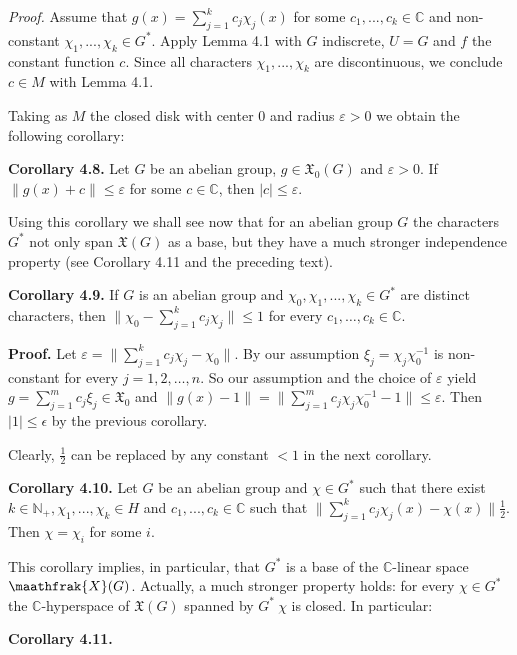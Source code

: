 \documentclass[12pt]{article}
\begin{document}
\emph{Proof.} Assume that $g(x) = \sum^k_{j=1} c_j \chi_j(x)$ for some $c_1,..., c_k \in \mathbb{C}$ and non-constant $\chi_1,...,\chi_k \in G^*$. Apply Lemma 4.1 with $G$
indiscrete, $U = G$ and $f$ the constant function $c$. Since all characters $\chi_1,...,\chi_k$ are discontinuous, we conclude $c \in M$ with
Lemma 4.1. 


    Taking as $M$ the closed disk with center 0 and radius $\varepsilon > 0$ we obtain the following corollary:


\textbf{Corollary 4.8.} Let $G$ be an abelian group, $g \in \mathfrak{X}_0 (G)$ and $\varepsilon > 0$. If $\|g(x) + c\| \leqslant  \varepsilon$ for some $c \in \mathbb{C}$, then $|c| \leqslant \varepsilon$.


    Using this corollary we shall see now that for an abelian group $G$ the characters $G^*$ not only span $\mathfrak{X}(G)$ as a base, but
they have a much stronger independence property (see Corollary 4.11 and the preceding text).


\textbf{Corollary 4.9.} If $G$ is an abelian group and $\chi_0,\chi_1,...,\chi_k \in G^*$ are distinct characters, then $\|\chi_0 - \sum^k_{j=1} c_j \chi_j\| \leqslant 1$ for every
$c_1, \dots, c_k \in \mathbb{C}$.


\textbf{Proof.} Let $\varepsilon = \| \sum^k_{j=1} c_j \chi_j - \chi_0 \|$. By our assumption $\xi_j = \chi_j \chi^{-1}_0$ is non-constant for every $j = 1, 2, \dots, n$. So our assumption
and the choice of $\varepsilon$ yield $g = \sum^m_{j=1} c_j \xi_j \in \mathfrak{X}_0$ and $\| g(x) - 1 \| = \| \sum^m_{j=1} c_j \chi_j \chi^{-1}_0 - 1\| \leqslant \varepsilon$. Then $|1| \leqslant \epsilon$ by the previous
corollary. 


    Clearly, $\frac{1}{2}$ can be replaced by any constant $< 1$ in the next corollary.


\textbf{Corollary 4.10.} Let $G$ be an abelian group and $\chi \in G^*$ such that there exist $k \in \mathbb{N}_+, \chi_1,...,\chi_k \in H$ and $c_1,..., c_k \in \mathbb{C}$ such that
$\| \sum^k_{j=1} c_j \chi_j (x) - \chi(x)\|  \frac{1}{2}$. Then $\chi = \chi_i$ for some $i$.


    This corollary implies, in particular, that $G^*$ is a base of the $\mathbb{C}$-linear space $\maathfrak{X}(G)$. Actually, a much stronger property
holds: for every $\chi \in G^*$ the $\mathbb{C}$-hyperspace of $\mathfrak{X}(G)$ spanned by $G^* \ {χ}$ is closed. In particular:


\textbf{Corollary 4.11.}
\end{document}
